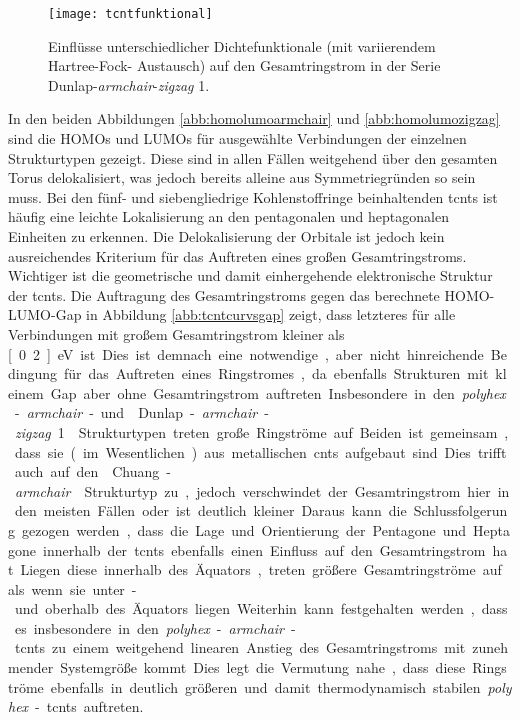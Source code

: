 \begin{figure}[ht!]
	\centering
	\texttt{[image: tcntfunktional]}
	\captionsetup{figurewithin = chapter}
	\captionsetup{font=small, labelfont=bf}\caption[Funktionaleinflüsse auf Ringströme]{Einflüsse unterschiedlicher Dichtefunktionale (mit variierendem Hartree-Fock-
Austausch) auf den Gesamtringstrom in der Serie \glqq Dunlap-\textit{armchair}-\textit{zigzag} 1\grqq{}.}
\label{abb:tcntfunktional}
\end{figure}

In den beiden Abbildungen \ref{abb:homolumoarmchair} und \ref{abb:homolumozigzag} sind die HOMOs und LUMOs für ausgewählte Verbindungen der einzelnen Strukturtypen gezeigt. Diese sind in allen Fällen weitgehend über den gesamten Torus delokalisiert, was jedoch bereits alleine aus Symmetriegründen so sein muss. Bei den fünf- und siebengliedrige Kohlenstoffringe beinhaltenden \acp{tcnt} ist häufig eine leichte Lokalisierung an den pentagonalen und heptagonalen Einheiten zu erkennen. Die Delokalisierung der Orbitale ist jedoch kein ausreichendes Kriterium für das Auftreten eines großen Gesamtringstroms. Wichtiger ist die geometrische und damit einhergehende elektronische Struktur der \acp{tcnt}. Die Auftragung des Gesamtringstroms gegen das berechnete HOMO-LUMO-Gap in Abbildung \ref{abb:tcntcurvsgap} zeigt, dass letzteres für alle Verbindungen mit großem Gesamtringstrom kleiner als \unit[0.2]{eV} ist. Dies ist demnach eine notwendige, aber nicht hinreichende Bedingung für das Auftreten eines Ringstromes, da ebenfalls Strukturen mit kleinem Gap aber ohne Gesamtringstrom auftreten. Insbesondere in den \textit{polyhex}-\textit{armchair}- und \glqq Dunlap-\textit{armchair}-\textit{zigzag} 1\grqq{} Strukturtypen treten große Ringströme auf. Beiden ist gemeinsam, dass sie (im Wesentlichen) aus metallischen \acp{cnt} aufgebaut sind. Dies trifft auch auf den \glqq Chuang-\textit{armchair}\grqq{} Strukturtyp zu, jedoch verschwindet der Gesamtringstrom hier in den meisten Fällen oder ist deutlich kleiner. Daraus kann die Schlussfolgerung gezogen werden, dass die Lage und Orientierung der Pentagone und Heptagone innerhalb der \acp{tcnt} ebenfalls einen Einfluss auf den Gesamtringstrom hat. Liegen diese innerhalb des Äquators, treten größere Gesamtringströme auf als wenn sie unter- und oberhalb des Äquators liegen. Weiterhin kann festgehalten werden, dass es insbesondere in den \textit{polyhex}-\textit{armchair}-\acp{tcnt} zu einem weitgehend linearen Anstieg des Gesamtringstroms mit zunehmender Systemgröße kommt. Dies legt die Vermutung nahe, dass diese Ringströme ebenfalls in deutlich größeren und damit thermodynamisch stabilen \textit{polyhex}-\acp{tcnt} auftreten.

